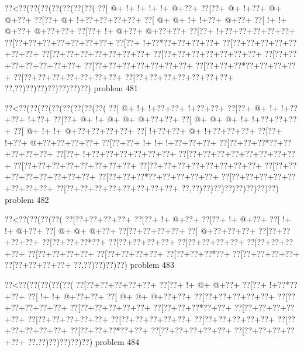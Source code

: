 \vbox{\vbox{\goo
\0??<\0??(\0??(\0??(\0??(\0??(\0??(\0??(
\0??[\- @+\- !+\- !+\- !+\- !+\- @+\0??+
\0??[\0??+\- @+\- !+\0??+\- @+\- @+\0??+
\0??[\0??+\- @+\- !+\0??+\0??+\0??+\0??+
\0??[\- @+\- @+\- !+\- !+\0??+\- @+\0??+
\0??[\- !+\- !+\- @+\0??+\- @+\0??+\0??+
\0??[\0??+\- !+\- @+\0??+\- @+\0??+\0??+
\0??[\0??+\- !+\0??+\0??+\0??+\0??+\0??+
\0??[\0??+\0??+\0??+\0??+\0??+\0??+\0??+
\0??[\0??+\- !+\0??*\0??+\0??+\0??+\0??+
\0??[\0??+\0??+\0??+\0??+\0??+\0??+\0??+
\0??[\0??+\0??+\0??+\0??+\0??+\0??+\0??+
\0??[\0??+\0??+\0??+\0??+\0??+\0??+\0??+
\0??[\0??+\0??+\0??+\0??+\0??+\0??+\0??+
\0??[\0??+\0??+\0??+\0??+\0??+\0??+\0??+
\0??[\0??+\0??+\0??*\0??+\0??+\0??+\0??+
\0??[\0??+\0??+\0??+\0??+\0??+\0??+\0??+
\0??[\0??+\0??+\0??+\0??+\0??+\0??+\0??+
\0??,\0??)\0??)\0??)\0??)\0??)\0??)\0??)
}
\hfil problem 481\hfil\break
}

\vbox{\vbox{\goo
\0??<\0??(\0??(\0??(\0??(\0??(\0??(\0??(\0??(
\0??[\- @+\- !+\- !+\0??+\0??+\- !+\0??+\0??+
\0??[\0??+\- @+\- !+\- !+\0??+\0??+\- !+\0??+
\0??[\0??+\- @+\- !+\- @+\- @+\- @+\0??+\0??+
\0??[\- @+\- @+\- @+\- !+\- !+\0??+\0??+\0??+
\0??[\- @+\- !+\- !+\- @+\0??+\0??+\0??+\0??+
\0??[\- !+\0??+\0??+\- @+\- !+\0??+\0??+\0??+
\0??[\0??+\- !+\0??+\- @+\0??+\0??+\0??+\0??+
\0??[\0??+\0??+\- !+\- !+\- !+\0??+\0??+\0??+
\0??[\0??+\0??+\0??*\0??+\0??+\0??+\0??+\0??+
\0??[\0??+\- !+\0??+\0??+\0??+\0??+\0??+\0??+
\0??[\0??+\0??+\0??+\0??+\0??+\0??+\0??+\0??+
\0??[\0??+\0??+\0??+\0??+\0??+\0??+\0??+\0??+
\0??[\0??+\0??+\0??+\0??+\0??+\0??+\0??+\0??+
\0??[\0??+\0??+\0??+\0??+\0??+\0??+\0??+\0??+
\0??[\0??+\0??+\0??*\0??+\0??+\0??+\0??+\0??+
\0??[\0??+\0??+\0??+\0??+\0??+\0??+\0??+\0??+
\0??[\0??+\0??+\0??+\0??+\0??+\0??+\0??+\0??+
\0??,\0??)\0??)\0??)\0??)\0??)\0??)\0??)\0??)
}
\hfil problem 482\hfil\break
}

\vbox{\vbox{\goo
\0??<\0??(\0??(\0??(\0??(
\0??[\0??+\0??+\0??+\0??+
\0??[\0??+\- !+\- @+\0??+
\0??[\0??+\- !+\- @+\0??+
\0??[\- !+\- !+\- @+\0??+
\0??[\- @+\- @+\- @+\0??+
\0??[\0??+\0??+\0??+\0??+
\0??[\- @+\0??+\0??+\0??+
\0??[\0??+\0??+\0??+\0??+
\0??[\0??+\0??+\0??*\0??+
\0??[\0??+\0??+\0??+\0??+
\0??[\0??+\0??+\0??+\0??+
\0??[\0??+\0??+\0??+\0??+
\0??[\0??+\0??+\0??+\0??+
\0??[\0??+\0??+\0??+\0??+
\0??[\0??+\0??+\0??*\0??+
\0??[\0??+\0??+\0??+\0??+
\0??[\0??+\0??+\0??+\0??+
\0??,\0??)\0??)\0??)\0??)
}
\hfil problem 483\hfil\break
}

\vbox{\vbox{\goo
\0??<\0??(\0??(\0??(\0??(\0??(
\0??[\0??+\0??+\0??+\0??+\0??+
\0??[\0??+\- !+\- @+\- @+\0??+
\0??[\0??+\- !+\0??*\0??+\0??+
\0??[\- !+\- !+\- @+\0??+\0??+
\0??[\- @+\- @+\- @+\0??+\0??+
\0??[\0??+\0??+\0??+\0??+\0??+
\0??[\0??+\0??+\0??+\0??+\0??+
\0??[\0??+\0??+\0??+\0??+\0??+
\0??[\0??+\0??+\0??*\0??+\0??+
\0??[\0??+\0??+\0??+\0??+\0??+
\0??[\0??+\0??+\0??+\0??+\0??+
\0??[\0??+\0??+\0??+\0??+\0??+
\0??[\0??+\0??+\0??+\0??+\0??+
\0??[\0??+\0??+\0??+\0??+\0??+
\0??[\0??+\0??+\0??*\0??+\0??+
\0??[\0??+\0??+\0??+\0??+\0??+
\0??[\0??+\0??+\0??+\0??+\0??+
\0??,\0??)\0??)\0??)\0??)\0??)
}
\hfil problem 484\hfil\break
}

